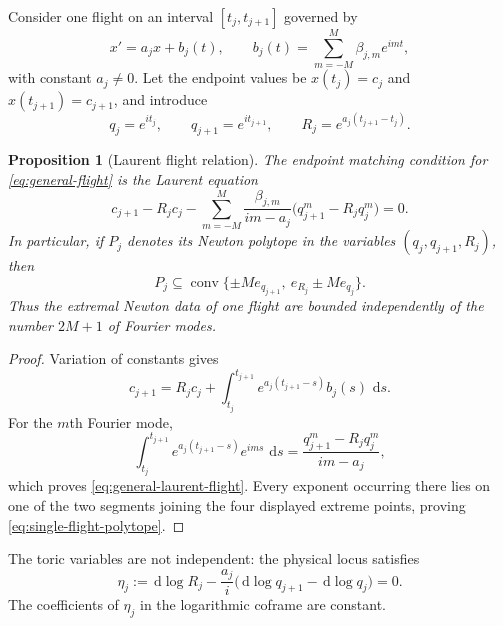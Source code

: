 \documentclass[11pt]{article}
\newtheorem{proposition}[theorem]{Proposition}
\newcommand{\dd}{\,\mathrm d}
\begin{document}
Consider one flight on an interval $[t_j,t_{j+1}]$ governed by
\begin{equation}\label{eq:general-flight}
 x'=a_jx+b_j(t),\qquad
 b_j(t)=\sum_{m=-M}^{M}\beta_{j,m}e^{imt},
\end{equation}
with constant $a_j\ne0$.  Let the endpoint values be $x(t_j)=c_j$ and $x(t_{j+1})=c_{j+1}$, and introduce
\begin{equation}\label{eq:general-toric-vars}
 q_j=e^{it_j},\qquad q_{j+1}=e^{it_{j+1}},\qquad
 R_j=e^{a_j(t_{j+1}-t_j)}.
\end{equation}

\begin{proposition}[Laurent flight relation]\label{prop:laurent-flight}
The endpoint matching condition for \eqref{eq:general-flight} is the Laurent equation
\begin{equation}\label{eq:general-laurent-flight}
 c_{j+1}-R_jc_j-
 \sum_{m=-M}^{M}\frac{\beta_{j,m}}{im-a_j}
 \bigl(q_{j+1}^{m}-R_jq_j^{m}\bigr)=0.
\end{equation}
In particular, if $P_j$ denotes its Newton polytope in the variables
$(q_j,q_{j+1},R_j)$, then
\begin{equation}\label{eq:single-flight-polytope}
 P_j\subseteq
 \operatorname{conv}\{\pm M e_{q_{j+1}},\ e_{R_j}\pm M e_{q_j}\}.
\end{equation}
Thus the extremal Newton data of one flight are bounded independently of the number $2M+1$ of Fourier modes.
\end{proposition}

\begin{proof}
Variation of constants gives
\[
 c_{j+1}=R_jc_j+
 \int_{t_j}^{t_{j+1}}e^{a_j(t_{j+1}-s)}b_j(s)\,\dd s.
\]
For the $m$th Fourier mode,
\[
 \int_{t_j}^{t_{j+1}}e^{a_j(t_{j+1}-s)}e^{ims}\,\dd s
 =\frac{q_{j+1}^{m}-R_jq_j^m}{im-a_j},
\]
which proves \eqref{eq:general-laurent-flight}.  Every exponent occurring there lies on one of the two segments joining the four displayed extreme points, proving \eqref{eq:single-flight-polytope}.
\end{proof}

The toric variables are not independent: the physical locus satisfies
\begin{equation}\label{eq:log-leaf-general}
 \eta_j:=\dd\log R_j-
 \frac{a_j}{i}\bigl(\dd\log q_{j+1}-\dd\log q_j\bigr)=0.
\end{equation}
The coefficients of $\eta_j$ in the logarithmic coframe are constant.
\end{document}
